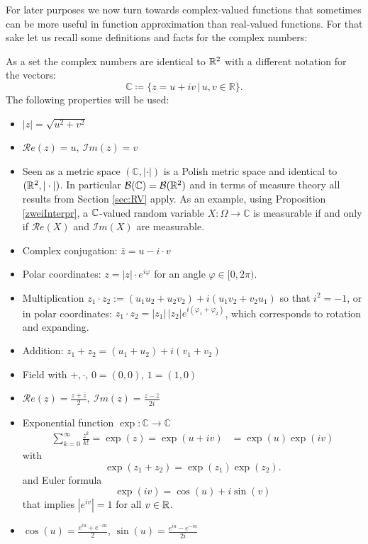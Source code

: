 For later purposes we now turn towards complex-valued functions that sometimes can be more useful in function approximation than real-valued functions. For that sake let us recall some definitions and facts for the complex numbers:
\begin{lstep}
  As a set the complex numbers are identical to $\mathbb{R}^2$ with a different notation for the vectors: $$\mathbb{C}\coloneqq \{ z = u+iv \,|\, u,v\in\mathbb{R} \}.$$ The following properties will be used:
	\begin{itemize}
		\item $\lvert z \rvert = \sqrt{u^2 + v^2}$
		\item $\mathcal{R}e(z) = u, \: \mathcal{I}m(z) = v$
		\item Seen as a metric space $( \mathbb{C}, |\cdot| )$ is a Polish metric space and identical to $(\mathbb{R}^2,|\cdot|)$. In particular $\mathcal B(\mathbb{C})=\mathcal B(\mathbb{R}^2)$ and in terms of measure theory all results from Section \ref{sec:RV} apply. As an example, using Proposition \ref{zweiInterpr}, a $\mathbb{C}$-valued random variable $X\colon \Omega \to \mathbb{C}$ is measurable if and only if $\mathcal{R}e(X)$ and $\mathcal{I}m(X)$ are measurable.
				\item Complex conjugation: $\bar{z} = u - i \cdot v$
		\item Polar coordinates: $z = \lvert z \rvert \cdot e^{i \varphi}$ for an angle $\varphi\in [0,2\pi)$.
		\item Multiplication $z_1\cdot z_2:= (u_1u_2+u_2v_2)+i(u_1v_2+v_2u_1)$ so that $i^2=-1$, or in polar coordinates: $z_1 \cdot z_2 = \lvert z_1 \rvert \, \lvert z_2 \rvert e^{i(\varphi_1 + \varphi_2)}$, which corresponds to rotation and expanding.
		\item Addition: $z_1 + z_2 = (u_1+u_2)+i(v_1+v_2)$
		\item Field with $+,\cdot$, $0=(0,0)$, $1=(1,0)$
		\item $\mathcal{R}e(z) = \frac{z+ \bar{z}}{2},\: \mathcal{I}m(z) = \frac{z-\bar{z}}{2i}$
		\item Exponential function $\exp\colon \mathbb{C} \to \mathbb{C}$ 
			\begin{align*}
				\sum_{k=0}^{\infty} \frac{z^k}{k!}=\exp(z) = \exp(u+iv) &= \exp(u)\exp(iv)
			\end{align*}
			with
			$$\exp(z_1 + z_2) = \exp(z_1)\exp(z_2).$$
			and Euler formula
			$$\exp(iv)=\cos(u)+i \sin(v)$$
			that implies $|e^{iv}|=1$ for all $v\in\mathbb{R}$.
		\item $\cos(u) = \frac{e^{iu}+ e^{-iu}}{2}$, $\sin(u) =  \frac{e^{iu} - e^{-iu}}{2i}$
	\end{itemize}
\end{lstep}
